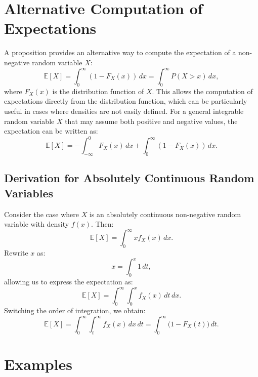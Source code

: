    \section{Alternative Computation of Expectations}
    A proposition provides an alternative way to compute the expectation of a non-negative random variable \( X \):
    \begin{equation}
    \mathbb{E}[X] = \int_0^{\infty} (1 - F_X(x)) \, dx = \int_0^{\infty} P(X > x) \, dx,
    \end{equation}
    where \( F_X(x) \) is the distribution function of \( X \). This allows the computation of expectations directly from the distribution function, which can be particularly useful in cases where densities are not easily defined. \newline
    For a general integrable random variable \( X \) that may assume both positive and negative values, the expectation can be written as:
    \begin{equation}
    \mathbb{E}[X] = -\int_{-\infty}^0 F_X(x) \, dx + \int_0^{\infty} (1 - F_X(x)) \, dx.
    \end{equation}
    
    \subsection{Derivation for Absolutely Continuous Random Variables}
    Consider the case where \( X \) is an absolutely continuous non-negative random variable with density \( f(x) \). Then:
    \[
    \mathbb{E}[X] = \int_0^{\infty} x f_X(x) \, dx.
    \]
    Rewrite \( x \) as:
    \[
    x = \int_0^x 1 \, dt,
    \]
    allowing us to express the expectation as:
    \[
    \mathbb{E}[X] = \int_0^{\infty} \int_0^x f_X(x) \, dt \, dx.
    \]
    Switching the order of integration, we obtain:
    \[
    \mathbb{E}[X] = \int_0^{\infty} \int_t^{\infty} f_X(x) \, dx \, dt = \int_0^{\infty} \big(1 - F_X(t)\big) \, dt.
    \]
    
    \section{Examples}

